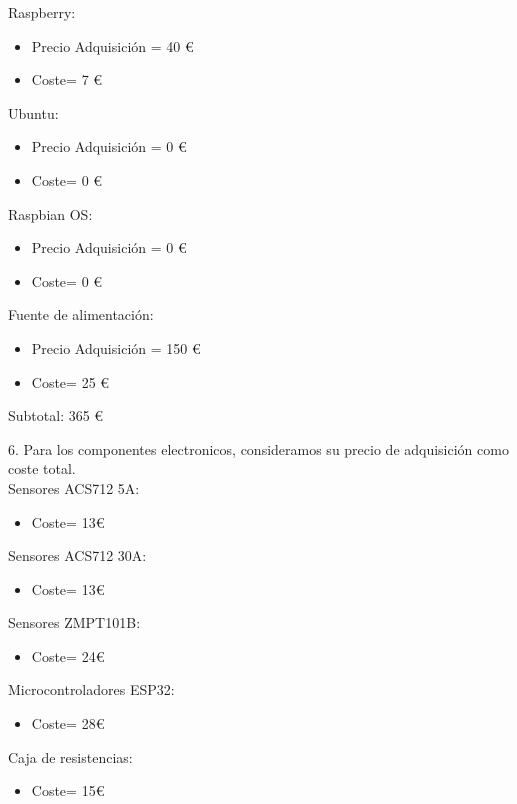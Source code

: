 \begin{titlepage}
Raspberry: 
\begin{itemize}
	\item Precio Adquisición = 40 \euro
	\item Coste= 7 \euro 
\end{itemize}

Ubuntu: 
\begin{itemize}
	\item Precio Adquisición = 0 \euro
	\item Coste= 0 \euro  
\end{itemize}

Raspbian OS: 
\begin{itemize}
	\item Precio Adquisición = 0 \euro
	\item Coste= 0 \euro  
\end{itemize}

Fuente de alimentación: 
\begin{itemize}
	\item Precio Adquisición = 150 \euro
	\item Coste= 25 \euro  
\end{itemize}

Subtotal: 365 \euro

6. Para los componentes electronicos, consideramos su precio de adquisición como coste total.\\

Sensores ACS712 5A:
\begin{itemize}
	\item Coste=  13\euro  
\end{itemize}

Sensores ACS712 30A:
\begin{itemize}
	\item Coste=  13\euro  
\end{itemize}

Sensores ZMPT101B:
\begin{itemize}
	\item Coste=  24\euro  
\end{itemize}

Microcontroladores ESP32:
\begin{itemize}
	\item Coste=  28\euro  
\end{itemize}

Caja de resistencias:
\begin{itemize}
	\item Coste=  15\euro  
\end{itemize}


\end{titlepage}
